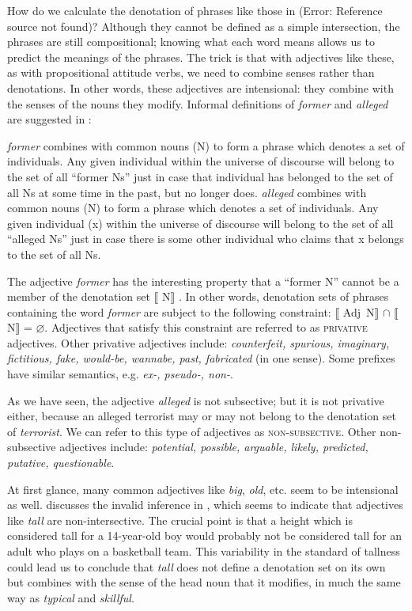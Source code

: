 How do we calculate the denotation of phrases like those in (Error: Reference source not found)? Although they cannot be defined as a simple intersection, the phrases are still compositional; knowing what each word means allows us to predict the meanings of the phrases. The trick is that with adjectives like these, as with propositional attitude verbs, we need to combine senses rather than denotations. In other words, these adjectives are intensional: they combine with the senses of the nouns they modify. Informal definitions of \textit{former} and \textit{alleged} are suggested in :


\ea \label{ex:15.11}
\ea   \textit{former} combines with common nouns (N) to form a phrase which denotes a set of individuals. Any given individual within the universe of discourse will belong to the set of all “former Ns” just in case that individual has belonged to the set of all Ns at some time in the past, but no longer does.
\ex  \textit{alleged} combines with common nouns (N) to form a phrase which denotes a set of individuals. Any given individual (x) within the universe of discourse will belong to the set of all “alleged Ns” just in case there is some other individual who claims that x belongs to the set of all Ns.
\z \z


The adjective \textit{former} has the interesting property that a “former N” cannot be a member of the denotation set $\llbracket$ N$\rrbracket$ . In other words, denotation sets of phrases containing the word \textit{former} are subject to the following constraint: $\llbracket$ Adj~N$\rrbracket$  ${\cap}$ $\llbracket$ N$\rrbracket$  = ⌀. Adjectives that satisfy this constraint are referred to as \textsc{privative} adjectives. Other privative adjectives include: \textit{counterfeit, spurious, imaginary, fictitious, fake, would-be, wannabe, past, fabricated} (in one sense). Some prefixes have similar semantics, e.g. \textit{ex-, pseudo-, non-}.



As we have seen, the adjective \textit{alleged} is not subsective; but it is not privative either, because an alleged terrorist may or may not belong to the denotation set of \textit{terrorist}. We can refer to this type of adjectives as \textsc{non-subsective}. Other non-subsective adjectives include: \textit{potential, possible, arguable, likely, predicted, putative, questionable}.



At first glance, many common adjectives like \textit{big}, \textit{old}, etc. seem to be intensional as well. \citet{Partee1995} discusses the invalid inference in , which seems to indicate that adjectives like \textit{tall} are non-intersective. The crucial point is that a height which is considered tall for a 14-year-old boy would probably not be considered tall for an adult who plays on a basketball team. This variability in the standard of tallness could lead us to conclude that \textit{tall} does not define a denotation set on its own but combines with the sense of the head noun that it modifies, in much the same way as \textit{typical} and \textit{skillful}.


